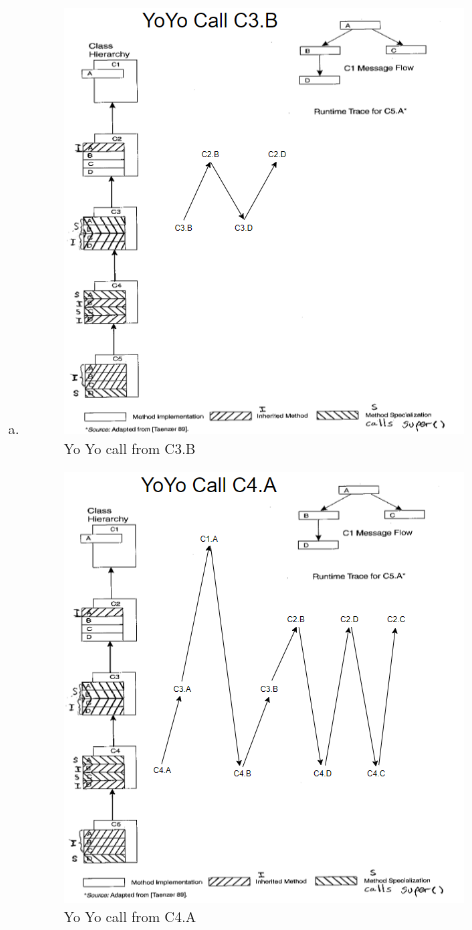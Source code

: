 \documentclass[11pt]{article}
\begin{document}

\begin{enumerate}[a)]
\item 
\begin{figure}[H]
    \centering
    \includegraphics[scale = 0.7]{./q3a2.png}
    \caption{Yo Yo call from C3.B}
    \label{fig:yoyo1}
\end{figure}

\begin{figure}[H]
    \centering
    \includegraphics[scale = 0.7]{./q3a1.png}
    \caption{Yo Yo call from C4.A}
    \label{fig:yoyo2}
\end{figure}




\end{enumerate}
\end{document}
